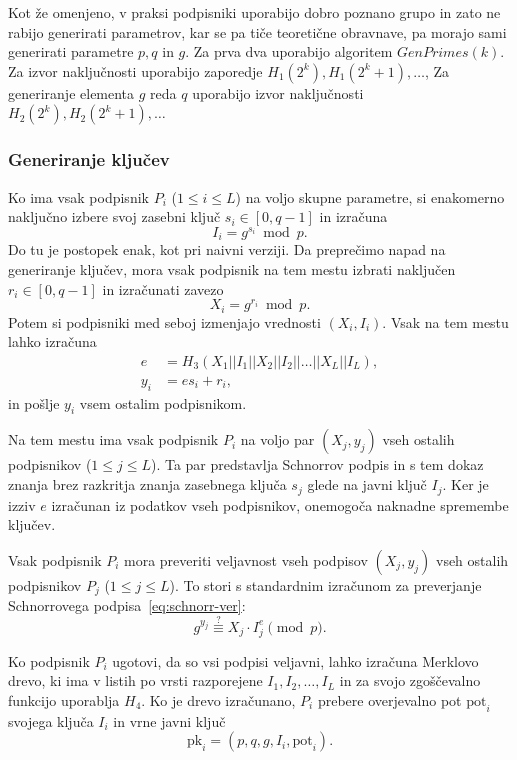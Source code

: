 \documentclass[isrm2, tisk]{fmfdelo}
\begin{document}
Kot že omenjeno, v praksi podpisniki uporabijo dobro poznano grupo in zato ne rabijo generirati
parametrov, kar se pa tiče teoretične obravnave, pa morajo sami generirati parametre $p, q$ in $g$.
Za prva dva uporabijo algoritem $GenPrimes(k)$. Za izvor naključnosti uporabijo zaporedje $H_1(2^k),
H_1(2^k + 1), \dots$, Za generiranje elementa $g$ reda $q$ uporabijo izvor naključnosti
$H_2(2^k), H_2(2^k + 1), \dots$

\subsubsection{Generiranje ključev}
Ko ima vsak podpisnik $P_i$ ($1 \le i \le L$) na voljo skupne parametre, si enakomerno naključno
izbere svoj zasebni ključ $s_i \in [0, q - 1]$ in izračuna
$$ 
I_i = g^{s_i} \bmod p.
$$
Do tu je postopek enak, kot pri naivni verziji. Da preprečimo napad na generiranje ključev, mora
vsak podpisnik na tem mestu izbrati naključen $r_i \in [0, q- 1]$ in izračunati zavezo
$$
X_i = g^{r_i} \bmod p.
$$
Potem si podpisniki med seboj izmenjajo vrednosti $(X_i, I_i)$. Vsak na tem mestu lahko izračuna
\begin{align*}
    e &= H_3(X_1 || I_1 || X_2 || I_2 || \dots || X_L || I_L), \\
    y_i &= e s_i + r_i,
\end{align*}
in pošlje $y_i$ vsem ostalim podpisnikom.

Na tem mestu ima vsak podpisnik $P_i$ na voljo par $(X_j, y_j)$ vseh ostalih podpisnikov ($1 \le j
\le L$). Ta par predstavlja Schnorrov podpis in s tem dokaz znanja brez razkritja znanja zasebnega
ključa $s_j$ glede na javni ključ $I_j$. Ker je izziv $e$ izračunan iz podatkov vseh podpisnikov,
onemogoča naknadne spremembe ključev. 

Vsak podpisnik $P_i$ mora preveriti veljavnost vseh podpisov $(X_j, y_j)$ vseh ostalih podpisnikov
$P_j$ ($1 \le j \le L$). To stori s standardnim izračunom za preverjanje Schnorrovega
podpisa~\eqref{eq:schnorr-ver}:
$$
g^{y_j} \stackrel{?}{\equiv} X_j \cdot I_j^{e} \pmod p.
$$

Ko podpisnik $P_i$ ugotovi, da so vsi podpisi veljavni, lahko izračuna Merklovo drevo, ki ima v
listih po vrsti razporejene $I_1, I_2, \dots, I_L$ in za svojo zgoščevalno funkcijo uporablja $H_4$.
Ko je drevo izračunano, $P_i$ prebere overjevalno pot $\text{pot}_i$ svojega ključa $I_i$ in vrne
javni ključ
$$ 
\text{pk}_i = (p, q, g, I_i, \text{pot}_i).
$$
\end{document}
